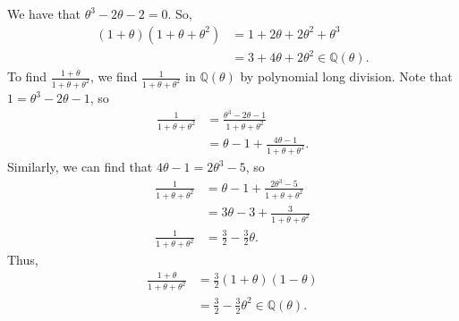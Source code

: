 \documentclass[10pt]{extarticle}
\newcommand{\Q}{\mathbb{Q}}
\begin{document}
  We have that $\theta^3 - 2\theta - 2 = 0$. So,
  \begin{align*}
    (1+\theta)(1+\theta + \theta^2) &= 1 + 2\theta + 2\theta^2 + \theta^3\\
                                    &= 3 + 4\theta + 2\theta^2 \in \Q(\theta).
  \end{align*}
  To find $\frac{1+\theta}{1+\theta + \theta^2}$, we find $\frac{1}{1+\theta+\theta^2}$ in $\Q(\theta)$ by polynomial long division. Note that $1 = \theta^3 - 2\theta - 1$, so
  \begin{align*}
    \frac{1}{1+\theta+\theta^2} &= \frac{\theta^3 - 2\theta - 1}{1 + \theta + \theta^2}\\
                                &= \theta - 1 + \frac{4\theta - 1}{1 + \theta + \theta^2}.
  \end{align*}
  Similarly, we can find that $4\theta - 1 = 2\theta^3 - 5$, so
  \begin{align*}
    \frac{1}{1 + \theta + \theta^2} &= \theta - 1 + \frac{2\theta^3 - 5}{1 + \theta + \theta^2}\\
                                    &= 3\theta - 3 + \frac{3}{1 + \theta + \theta^2}\\
    \frac{1}{1 + \theta + \theta^2} &= \frac{3}{2} - \frac{3}{2}\theta.
  \end{align*}
  Thus,
  \begin{align*}
    \frac{1+\theta}{1 + \theta + \theta^2} &= \frac{3}{2}(1+\theta)(1-\theta)\\
                                           &= \frac{3}{2} - \frac{3}{2}\theta^2 \in \Q(\theta).
  \end{align*}
\end{document}
